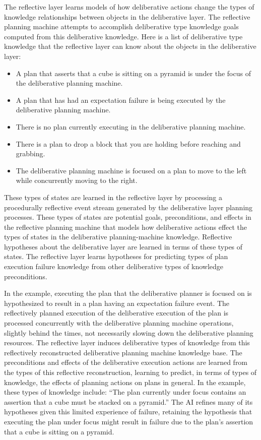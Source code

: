 The reflective layer learns models of how deliberative actions change
the types of knowledge relationships between objects in the
deliberative layer.  The reflective planning machine attempts to
accomplish deliberative type knowledge goals computed from this
deliberative knowledge.  Here is a list of deliberative type knowledge
that the reflective layer can know about the objects in the
deliberative layer:
\begin{itemize}
\item A plan that asserts that a cube is sitting on a pyramid is
  under the focus of the deliberative planning machine.
\item A plan that has had an expectation failure is being executed by
  the deliberative planning machine.
\item There is no plan currently executing in the deliberative
  planning machine.
\item There is a plan to drop a block that you are holding before
  reaching and grabbing.
\item The deliberative planning machine is focused on a plan to move
  to the left while concurrently moving to the right.
\end{itemize}
These types of states are learned in the reflective layer by
processing a procedurally reflective event stream generated by the
deliberative layer planning processes.  These types of states are
potential goals, preconditions, and effects in the reflective planning
machine that models how deliberative actions effect the types of
states in the deliberative planning-machine knowledge.  Reflective
hypotheses about the deliberative layer are learned in terms of these
types of states.  The reflective layer learns hypotheses for
predicting types of plan execution failure knowledge from other
deliberative types of knowledge preconditions.

In the example, executing the plan that the deliberative planner is
focused on is hypothesized to result in a plan having an expectation
failure event.  The reflectively planned execution of the deliberative
execution of the plan is processed concurrently with the deliberative
planning machine operations, slightly behind the times, not
necessarily slowing down the deliberative planning resources.  The
reflective layer induces deliberative types of knowledge from this
reflectively reconstructed deliberative planning machine knowledge
base.  The preconditions and effects of the deliberative execution
actions are learned from the types of this reflective reconstruction,
learning to predict, in terms of types of knowledge, the effects of
planning actions on plans in general.  In the example, these types of
knowledge include: ``The plan currently under focus contains an
assertion that a cube must be stacked on a pyramid.''  The AI refines
many of its hypotheses given this limited experience of failure,
retaining the hypothesis that executing the plan under focus might
result in failure due to the plan's assertion that a cube is sitting
on a pyramid.

